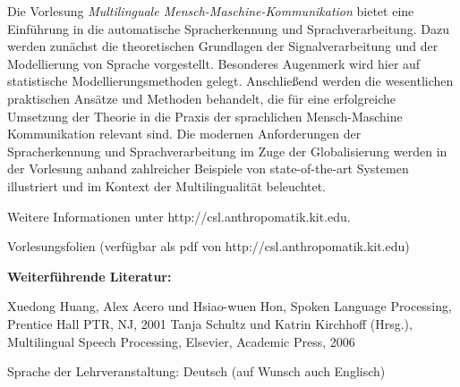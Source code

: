 \begin{course}
\begin{learningoutcomes}
\end{learningoutcomes}

\begin{content}
Die Vorlesung \emph{Multilinguale Mensch-Maschine-Kommunikation} bietet eine Einführung in die automatische Spracherkennung und Sprachverarbeitung. Dazu werden zunächst die theoretischen Grundlagen der Signalverarbeitung und der Modellierung von Sprache vorgestellt. Besonderes Augenmerk wird hier auf statistische Modellierungsmethoden gelegt. Anschließend werden die wesentlichen praktischen Ansätze und Methoden behandelt, die für eine erfolgreiche Umsetzung der Theorie in die Praxis der sprachlichen Mensch-Maschine Kommunikation relevant sind. Die modernen Anforderungen der Spracherkennung und Sprachverarbeitung im Zuge der Globalisierung werden in der Vorlesung anhand zahlreicher Beispiele von state-of-the-art Systemen illustriert und im Kontext der Multilingualität beleuchtet.

 

Weitere Informationen unter http://csl.anthropomatik.kit.edu.


\end{content}

\begin{media}Vorlesungsfolien (verfügbar als pdf von http://csl.anthropomatik.kit.edu)

\end{media}

\begin{literature}\textbf{Weiterführende Literatur:}

 

Xuedong Huang, Alex Acero und Hsiao-wuen Hon, Spoken Language Processing, Prentice Hall PTR, NJ, 2001\newline
Tanja Schultz und Katrin Kirchhoff (Hrsg.), Multilingual Speech Processing, Elsevier, Academic Press, 2006

\end{literature}

\begin{remarks}Sprache der Lehrveranstaltung: Deutsch (auf Wunsch auch Englisch)

\end{remarks}

\end{course}
